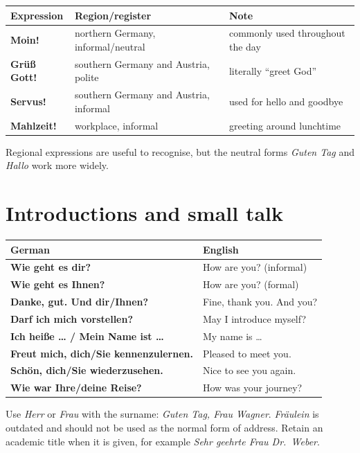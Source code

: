 \begin{center}
\small
{}
\begin{tabularx}{\textwidth}{@{}>{\bfseries}l l X@{}}
\toprule
Expression & Region/register & Note \\
\midrule
Moin! & northern Germany, informal/neutral & commonly used throughout the day \\
Grüß Gott! & southern Germany and Austria, polite & literally \enquote{greet God} \\
Servus! & southern Germany and Austria, informal & used for hello and goodbye \\
Mahlzeit! & workplace, informal & greeting around lunchtime \\
\bottomrule
\end{tabularx}
\end{center}

Regional expressions are useful to recognise, but the neutral forms
\textit{Guten Tag} and \textit{Hallo} work more widely.

\section{Introductions and small talk}

\begin{center}
\small
{}
\begin{tabularx}{\textwidth}{@{}>{\bfseries}X X@{}}
\toprule
German & English \\
\midrule
Wie geht es dir? & How are you? (informal) \\
Wie geht es Ihnen? & How are you? (formal) \\
Danke, gut. Und dir/Ihnen? & Fine, thank you. And you? \\
Darf ich mich vorstellen? & May I introduce myself? \\
Ich heiße \ldots{} / Mein Name ist \ldots{} & My name is \ldots{} \\
Freut mich, dich/Sie kennenzulernen. & Pleased to meet you. \\
Schön, dich/Sie wiederzusehen. & Nice to see you again. \\
Wie war Ihre/deine Reise? & How was your journey? \\
\bottomrule
\end{tabularx}
\end{center}

Use \textit{Herr} or \textit{Frau} with the surname:
\textit{Guten Tag, Frau Wagner}. \textit{Fräulein} is outdated and should not
be used as the normal form of address. Retain an academic title when it is
given, for example \textit{Sehr geehrte Frau Dr.~Weber}.

